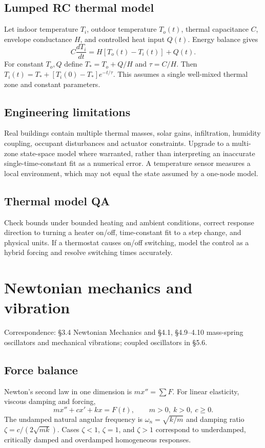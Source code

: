\documentclass[11pt,letterpaper,oneside]{report}
\theoremstyle{definition}\newtheorem{definition}[theorem]{Definition}
\theoremstyle{remark}\newtheorem{remark}[theorem]{Remark}
\begin{document}
\section{Lumped RC thermal model}
Let indoor temperature $T_i$, outdoor temperature $T_o(t)$, thermal capacitance $C$, envelope conductance $H$, and controlled heat input $Q(t)$. Energy balance gives
\[C\frac{dT_i}{dt}=H[T_o(t)-T_i(t)]+Q(t).\]
For constant $T_o,Q$ define $T_*=T_o+Q/H$ and $\tau=C/H$. Then $T_i(t)=T_*+[T_i(0)-T_*]e^{-t/\tau}$. This assumes a single well-mixed thermal zone and constant parameters.
\section{Engineering limitations}
Real buildings contain multiple thermal masses, solar gains, infiltration, humidity coupling, occupant disturbances and actuator constraints. Upgrade to a multi-zone state-space model where warranted, rather than interpreting an inaccurate single-time-constant fit as a numerical error. A temperature sensor measures a local environment, which may not equal the state assumed by a one-node model.
\section{Thermal model QA}
Check bounds under bounded heating and ambient conditions, correct response direction to turning a heater on/off, time-constant fit to a step change, and physical units. If a thermostat causes on/off switching, model the control as a hybrid forcing and resolve switching times accurately.
\chapter{Newtonian mechanics and vibration}
\begin{bookground}Correspondence: \S3.4 Newtonian Mechanics and \S4.1, \S4.9--4.10 mass-spring oscillators and mechanical vibrations; coupled oscillators in \S5.6.\end{bookground}
\section{Force balance}
Newton's second law in one dimension is $m x''=\sum F$. For linear elasticity, viscous damping and forcing,
\[m x''+c x'+k x=F(t),\qquad m>0,\ k>0,\ c\ge0.\]
The undamped natural angular frequency is $\omega_n=\sqrt{k/m}$ and damping ratio $\zeta=c/(2\sqrt{mk})$. Cases $\zeta<1$, $\zeta=1$, and $\zeta>1$ correspond to underdamped, critically damped and overdamped homogeneous responses.
\end{document}
